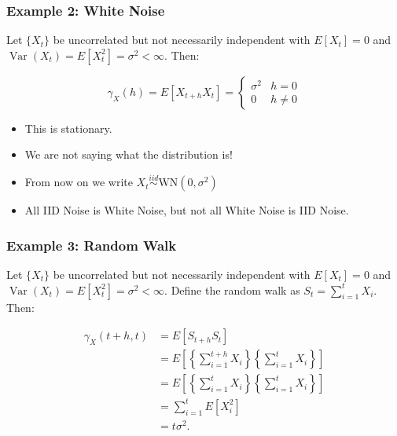 \documentclass{beamer}
\begin{document}

\begin{frame}
\frametitle{Example 2: White Noise}

Let $\{X_t\}$ be uncorrelated but not necessarily independent with $E[X_t] = 0$ and $\operatorname{Var}(X_t) = E[X_t^2] = \sigma^2 < \infty$. Then:

\[ 
\gamma_X(h) = E[X_{t+h}X_t] = 
  \begin{cases} 
      \sigma^2 & h = 0 \\
      0 & h \neq 0 
   \end{cases}
\]

\begin{itemize}
\item This is stationary.
\item We are not saying what the distribution is!
\item From now on we write $X_t \overset{iid}{\sim} \text{WN}(0, \sigma^2)$
\item All IID Noise is White Noise, but not all White Noise is IID Noise.
\end{itemize}

\end{frame}



\begin{frame}
\frametitle{Example 3: Random Walk}

Let $\{X_t\}$ be uncorrelated but not necessarily independent with $E[X_t] = 0$ and $\operatorname{Var}(X_t) = E[X_t^2] = \sigma^2 < \infty$. Define the random walk as $S_t = \sum_{i=1}^t X_i$. Then:

\begin{align*}
\gamma_X(t+h,t) &= E[S_{t+h}S_t] \\
&= E\left[\left\{\sum_{i=1}^{t+h} X_i\right\} \left\{ \sum_{i=1}^t X_i \right\}\right] \\
&=  E\left[\left\{\sum_{i=1}^{t} X_i \right\} \left\{\sum_{i=1}^t X_i \right\}\right] \\
&= \sum_{i=1}^t E[X_i^2] \\
&=  t \sigma^2.
\end{align*}


\end{frame}
\end{document}
